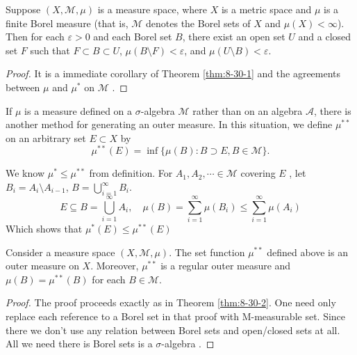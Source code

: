 \documentclass[../main.tex]{subfiles}
\begin{document}
\begin{theorem}{}{}
Suppose $(X,\mathcal{M},\mu)$ is a measure space, where $X$ is a metric space and $\mu$ is a finite Borel measure (that is, $\mathcal{M}$ denotes the Borel sets of $X$ and $\mu(X) < \infty$). Then for each $\varepsilon > 0$ and each Borel set $B$, there exist an open set $U$ and a closed set $F$ such that $F \subset B \subset U$, $\mu(B \setminus F) < \varepsilon$, and $\mu(U \setminus B) < \varepsilon$.
\end{theorem}

\begin{proof}
    It is a immediate corollary of Theorem \ref{thm:8-30-1} and the agreements between \(  \mu   \) and \(  \mu ^{*}  \) on \(  \mathcal{M}  \)   .
\end{proof}

\begin{definition}{}{}
    If $\mu$ is a measure defined on a $\sigma$-algebra $\mathcal{M}$ rather than on an algebra $\mathcal{A}$, there is another method for generating an outer measure. In this situation, we define $\mu^{**}$ on an arbitrary set $E \subset X$ by
\[
\mu^{**}(E) = \inf\{\mu(B) : B \supset E, B \in \mathcal{M}\}.
\]

\end{definition}
\begin{remark}
   We know \(  \mu ^{*}\le \mu ^{**}  \) from  definition.   
    For \(  A_1,A_2,\cdots  \in \mathcal{M}  \) covering \(  E  \) , let \(  B_{i}= A_{i}\setminus A_{i-1}  \), \(  B= \bigcup _{i= 1}^{\infty}B_{i}  \).   \[
  E\subseteq   B= \bigcup _{i= 1}^{\infty}A_{i},\quad \mu \left( B \right)= \sum _{i= 1}^{\infty}\mu \left( B_{i} \right)\le \sum _{i= 1}^{\infty}\mu \left( A_{i} \right)   
    \] Which shows that  \(  \mu ^{*}\left( E \right)\le \mu ^{**}\left( E \right)    \) 
\end{remark}
\begin{theorem}{}{}
Consider a measure space $(X, \mathcal{M}, \mu)$. The set function $\mu^{**}$ defined above is an outer measure on $X$. Moreover, $\mu^{**}$ is a regular outer measure and $\mu(B) = \mu^{**}(B)$ for each $B \in \mathcal{M}$.
\end{theorem}

\begin{proof}
     The proof proceeds exactly as in Theorem \ref{thm:8-30-2}. One need only
 replace each reference to a Borel set in that proof with M-measurable set. Since there we don't use any relation between Borel sets and open/closed sets at all. All we need there is Borel sets is a \(   \sigma   \)-algebra .
\end{proof}
\end{document}
